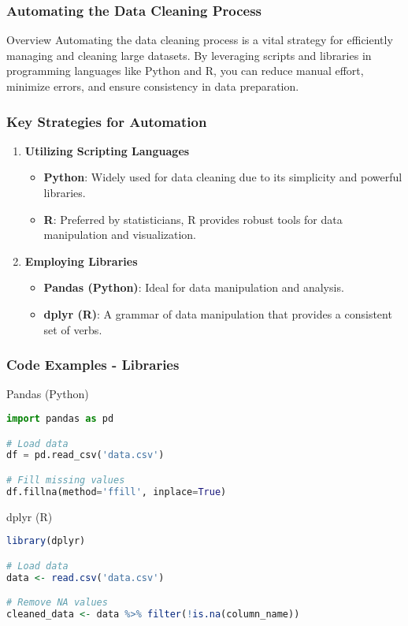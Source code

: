 \documentclass[aspectratio=169]{beamer}
\begin{document}
\begin{frame}
    \frametitle{Automating the Data Cleaning Process}
    \begin{block}{Overview}
        Automating the data cleaning process is a vital strategy for efficiently managing and cleaning large datasets. By leveraging scripts and libraries in programming languages like Python and R, you can reduce manual effort, minimize errors, and ensure consistency in data preparation.
    \end{block}
\end{frame}

\begin{frame}
    \frametitle{Key Strategies for Automation}
    \begin{enumerate}
        \item \textbf{Utilizing Scripting Languages}
        \begin{itemize}
            \item \textbf{Python}: Widely used for data cleaning due to its simplicity and powerful libraries.
            \item \textbf{R}: Preferred by statisticians, R provides robust tools for data manipulation and visualization.
        \end{itemize}
        
        \item \textbf{Employing Libraries}
        \begin{itemize}
            \item \textbf{Pandas (Python)}: Ideal for data manipulation and analysis.
            \item \textbf{dplyr (R)}: A grammar of data manipulation that provides a consistent set of verbs.
        \end{itemize}
    \end{enumerate}
\end{frame}

\begin{frame}[fragile]
    \frametitle{Code Examples - Libraries}
    \begin{block}{Pandas (Python)}
        \begin{lstlisting}[language=Python]
import pandas as pd

# Load data
df = pd.read_csv('data.csv')

# Fill missing values
df.fillna(method='ffill', inplace=True)
        \end{lstlisting}
    \end{block}
    
    \begin{block}{dplyr (R)}
        \begin{lstlisting}[language=R]
library(dplyr)

# Load data
data <- read.csv('data.csv')

# Remove NA values
cleaned_data <- data %>% filter(!is.na(column_name))
        \end{lstlisting}
    \end{block}
\end{frame}
\end{document}
